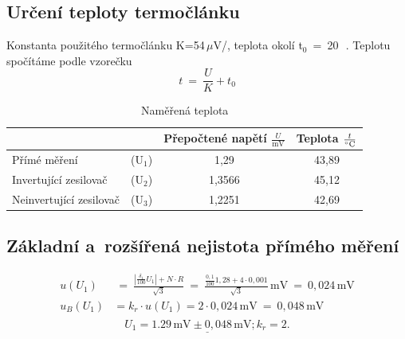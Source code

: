 \documentclass[a4paper,12pt]{article}   %
\newcommand{\sub}[1]{$_\textrm{#1}$}
\newcommand{\ui}{U$_\textrm{1}$}
\newcommand{\uii}{U$_\textrm{2}$}
\newcommand{\uiii}{U$_\textrm{3}$}
\begin{document}
\subsection{Určení teploty termočlánku}
Konstanta použitého termočlánku K=54\,$\mu$V/\celsius, teplota okolí t\sub{0}~=~20\,\celsius~\cite{navod}. Teplotu spočítáme podle vzorečku 
\begin{equation*}
    t~=~\frac{U}{K}+t_0
\end{equation*}
\begin{table}[h!]
    \centering
    \begin{tabular}{|lr|c|c|}
    \hline
        \rule{0pt}{2.5ex}
        && Přepočtené napětí $\frac{U}{\textrm{mV}}$ & Teplota $\frac{t}{\celsius}$\\[.7ex] \hline\hline
        Přímé měření &(\ui)        & 1,29      & 43,89 \\\hline
        Invertující zesilovač &(\uii)   & 1,3566    & 45,12 \\\hline
        Neinvertující zesilovač &(\uiii) & 1,2251    & 42,69 \\\hline
    \end{tabular}
    \caption{Naměřená teplota}
    \label{tab:teplota}
\end{table}

\subsection{Základní a~rozšířená nejistota přímého měření}
\begin{equation*}
    \begin{split}
        u(U_1)&~=~\frac{|\frac{\delta_1}{100}U_1|+N\cdot R}{\sqrt{3}}~=~\frac{\frac{0,1}{100}1,28+4\cdot 0,001}{\sqrt{3}}\,\textrm{mV}~=~0,024\,\textrm{mV}\\
        u_B(U_1)&=k_r\cdot u(U_1)=2\cdot0,024\,\textrm{mV}~=~0,048\,\textrm{mV}\\
    \end{split}
\end{equation*}
\begin{equation*}
    \underline{U_1=1.29\,\textrm{mV} \pm 0,048\,\textrm{mV}; k_r=2.}
\end{equation*}
\end{document}
